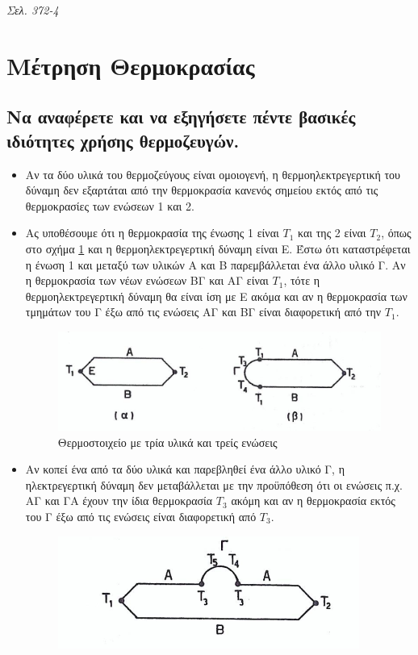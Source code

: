 \documentclass{article}
\begin{document}
\emph{Σελ. 372-4}
\section{Μέτρηση Θερμοκρασίας}
\subsection{Να αναφέρετε και να εξηγήσετε πέντε βασικές ιδιότητες χρήσης θερμοζευγών.}
\begin{itemize}
    \item Αν τα δύο υλικά του θερμοζεύγους είναι ομοιογενή, η θερμοηλεκτρεγερτική του δύναμη δεν εξαρτάται από την θερμοκρασία κανενός σημείου εκτός από τις θερμοκρασίες των ενώσεων 1
        και 2.
    \item Ας υποθέσουμε ότι η θερμοκρασία της ένωσης 1 είναι $T_1$ και της 2 είναι $T_2$, όπως στο σχήμα \ref{fig:7.1thermo1} και η θερμοηλεκτρεγερτική δύναμη είναι Ε. 
        Έστω ότι καταστρέφεται η ένωση 1 και μεταξύ των υλικών Α και Β παρεμβάλλεται ένα άλλο υλικό Γ. Αν η θερμοκρασία των νέων ενώσεων ΒΓ και ΑΓ είναι $T_1$, τότε η 
        θερμοηλεκτρεγερτική δύναμη θα είναι ίση με Ε ακόμα και αν η θερμοκρασία των τμημάτων του Γ έξω από τις ενώσεις ΑΓ και ΒΓ είναι διαφορετική από την $T_1$.
        \begin{figure}[h!]
            \includegraphics[width=\linewidth]{thermozevgi1.png}
            \caption{Θερμοστοιχείο με τρία υλικά και τρείς ενώσεις}
            \label{fig:7.1thermo1}
        \end{figure}
    \item Αν κοπεί ένα από τα δύο υλικά και παρεβληθεί ένα άλλο υλικό Γ, η ηλεκτρεγερτική δύναμη δεν μεταβάλλεται με την προϋπόθεση ότι οι ενώσεις π.χ. ΑΓ και ΓΑ έχουν την ίδια 
        θερμοκρασία $T_3$ ακόμη και αν η θερμοκρασία εκτός του Γ έξω από τις ενώσεις είναι διαφορετική από $T_3$.
        \begin{figure}[h!]
            \includegraphics[width=\linewidth]{thermozevgi2.png}

\end{figure}
\end{itemize}
\end{document}
